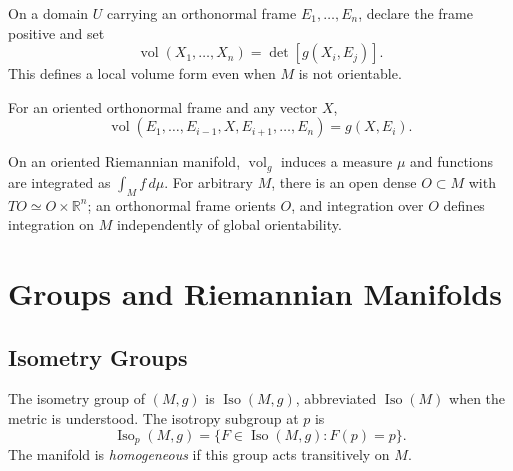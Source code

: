 \begin{definition}
  \label{def:pet-ch1-volume-form-local}


  On a domain $U$ carrying an orthonormal frame $E_1,\ldots,E_n$, declare the
  frame positive and set
  \[
    \operatorname{vol}(X_1,\ldots,X_n)=\det[g(X_i,E_j)].
  \]
  This defines a local volume form even when $M$ is not orientable.
\end{definition}

\begin{remark}
  \label{rem:pet-ch1-height-base}


  For an oriented orthonormal frame and any vector $X$,
  \[
    \operatorname{vol}(E_1,\ldots,E_{i-1},X,E_{i+1},\ldots,E_n)
      =g(X,E_i).
  \]
\end{remark}

\begin{remark}
  \label{rem:pet-ch1-integration-riemannian}


  On an oriented Riemannian manifold, $\operatorname{vol}_g$ induces a measure
  $\mu$ and functions are integrated as $\int_M f\,d\mu$. For arbitrary $M$,
  there is an open dense $O\subset M$ with
  $TO\simeq O\times\mathbb{R}^n$; an orthonormal frame orients $O$, and
  integration over $O$ defines integration on $M$ independently of global
  orientability.
\end{remark}

\section{Groups and Riemannian Manifolds}

\subsection{Isometry Groups}

\begin{definition}
  \label{def:pet-ch1-isometry-group}


  The isometry group of $(M,g)$ is $\operatorname{Iso}(M,g)$, abbreviated
  $\operatorname{Iso}(M)$ when the metric is understood. The isotropy subgroup
  at $p$ is
  \[
    \operatorname{Iso}_p(M,g)=\{F\in\operatorname{Iso}(M,g):F(p)=p\}.
  \]
  The manifold is \emph{homogeneous} if this group acts transitively on $M$.
\end{definition}

